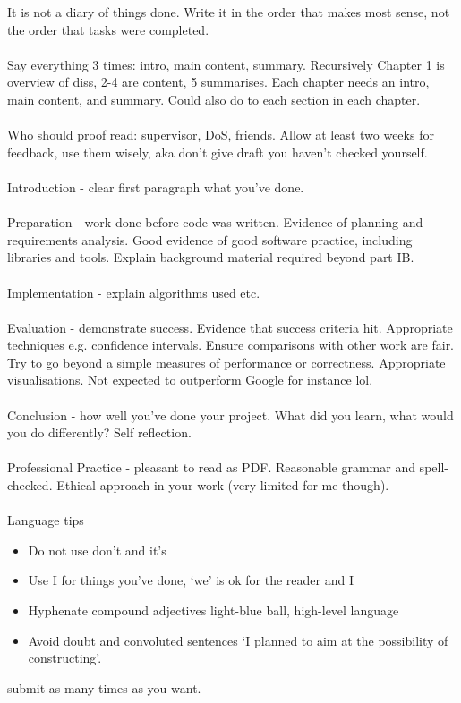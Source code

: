 \documentclass{report}
\begin{document}
It is not a diary of things done. Write it in the order that makes most sense, not the order that tasks were completed.
\\\\
Say everything 3 times: intro, main content, summary. Recursively
Chapter 1 is overview of diss, 2-4 are content, 5 summarises.
Each chapter needs an intro, main content, and summary. Could also do to each section in each chapter.
\\\\
Who should proof read: supervisor, DoS, friends. Allow at least two weeks for feedback, use them wisely, aka don't give draft you haven't checked yourself.
\\\\
Introduction - clear first paragraph what you've done.
\\\\
Preparation -
work done before code was written. Evidence of planning and requirements analysis. Good evidence of good software practice, including libraries and tools. Explain background material required beyond part IB.
\\\\
Implementation - explain algorithms used etc.
\\\\
Evaluation - demonstrate success. Evidence that success criteria hit. Appropriate techniques e.g. confidence intervals. Ensure comparisons with other work are fair. Try to go beyond a simple measures of performance or correctness. Appropriate visualisations. Not expected to outperform Google for instance lol.
\\\\
Conclusion - how well you've done your project. What did you learn, what would you do differently? Self reflection.
\\\\
Professional Practice - pleasant to read as PDF. Reasonable grammar and spell-checked. Ethical approach in your work (very limited for me though).
\\\\
Language tips
\begin{itemize}
	\item Do not use don't and it's
	\item Use I for things you've done, `we' is ok for the reader and I
	\item Hyphenate compound adjectives light-blue ball, high-level language
	\item Avoid doubt and convoluted sentences `I planned to aim at the possibility of constructing'.
\end{itemize}

submit as many times as you want.
\end{document}
